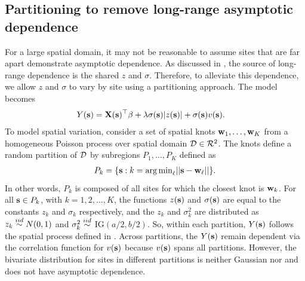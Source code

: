 \subsection{Partitioning to remove long-range asymptotic dependence}\label{sts:part}
For a large spatial domain, it may not be reasonable to assume sites that are far apart demonstrate asymptotic dependence.%
As discussed in , the source of long-range dependence is the shared $z$ and $\sigma$.
Therefore, to alleviate this dependence, we allow $z$ and $\sigma$ to vary by site using a partitioning approach.
The model becomes
\begin{align} \label{steq:partition}
  Y(\mathbf{s}) &= \mathbf{X}(\mathbf{s})^\top \mathbf{\beta} + \lambda \sigma(\mathbf{s}) |z(\mathbf{s})| + \sigma(\mathbf{s}) v(\mathbf{s}).
\end{align}
To model spatial variation, consider a set of spatial knots $\mathbf{w}_1, \ldots, \mathbf{w}_K$ from a homogeneous Poisson process over spatial domain ${\cal D} \in {\cal R}^2$.
The knots define a random partition of ${\cal D}$ by subregions $P_{1}, \ldots, P_{K}$ defined as
\begin{align} \label{steq:subregions}
  P_{k} = \{ \mathbf{s} : k = {\mathop{\rm arg\, min}}_\ell || \mathbf{s} - \mathbf{w}_{\ell} || \}.
\end{align}
In other words, $P_k$ is composed of all sites for which the closest knot is $\mathbf{w}_k$.
For all $\mathbf{s} \in P_k$, with $k = 1, 2, \ldots, K$, the functions $z(\mathbf{s})$ and $\sigma(\mathbf{s})$ are equal to the constants $z_k$ and $\sigma_k$ respectively, and the $z_k$ and $\sigma^2_k$ are distributed as $z_k \stackrel{iid}{\sim} N(0, 1)$ and $\sigma^2_k \stackrel{iid}{\sim}$ IG$(a / 2, b / 2)$.
So, within each partition, $Y(\mathbf{s})$ follows the spatial \skewt process defined in .
Across partitions, the $Y(\mathbf{s})$ remain dependent via the correlation function for $v(\mathbf{s})$ because $v(\mathbf{s})$ spans all partitions.
However, the bivariate distribution for sites in different partitions is neither Gaussian nor \skewt and does not have asymptotic dependence.

